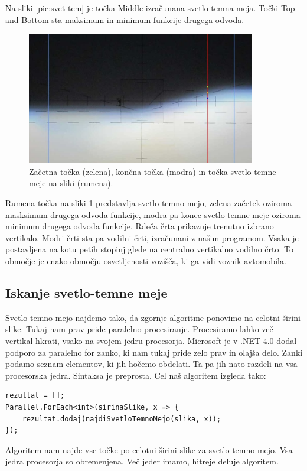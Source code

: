 \documentclass[oneside, a4paper, 12pt]{book}
\begin{document}
Na sliki \ref{pic:svet-tem} je točka Middle izračunana svetlo-temna meja. Točki Top and Bottom sta maksimum in minimum funkcije drugega odvoda. 


\begin{figure}
\begin{center}
\includegraphics[width=10cm]{slike/svetlo-temna-meja-orig-crop.jpg}
\end{center}
\caption{Začetna točka (zelena), končna točka (modra) in točka svetlo temne meje na sliki (rumena).}
\label{pic:svet-tem2}
\end{figure}

Rumena točka na sliki \ref{pic:svet-tem2} predstavlja svetlo-temno mejo, zelena začetek oziroma masksimum drugega odvoda funkcije, modra pa konec svetlo-temne meje oziroma minimum drugega odvoda funkcije. Rdeča črta prikazuje trenutno izbrano vertikalo. Modri črti sta pa vodilni črti, izračunani z našim programom. Vsaka je postavljena na kotu petih stopinj glede na centralno vertikalno vodilno črto. To območje je enako območju osvetljenosti vozišča, ki ga vidi voznik avtomobila.


\subsection{Iskanje svetlo-temne meje}
\label{ch:iskanj-sv-t-m}
Svetlo temno mejo najdemo tako, da zgornje algoritme ponovimo na celotni širini slike. Tukaj nam prav pride paralelno procesiranje. Procesiramo lahko več vertikal hkrati, vsako na svojem jedru procesorja. Microsoft je v .NET 4.0 dodal podporo za paralelno for zanko, ki nam tukaj pride zelo prav in olajša delo. Zanki podamo seznam elementov, ki jih hočemo obdelati. Ta pa jih nato razdeli na vsa procesorska jedra. Sintaksa je preprosta. Cel naš algoritem izgleda tako:
\begin{samepage}
\begin{verbatim}
rezultat = [];
Parallel.ForEach<int>(sirinaSlike, x => {
    rezultat.dodaj(najdiSvetloTemnoMejo(slika, x));
});
\end{verbatim}
\end{samepage}
Algoritem nam najde vse točke po celotni širini slike za svetlo temno mejo. Vsa jedra procesorja so obremenjena. Več jeder imamo, hitreje deluje algoritem.
\end{document}
